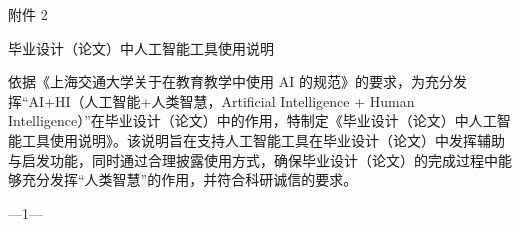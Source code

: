 
\begingroup
{}
\pagestyle{empty}
\flushbottom
{}
\setlength{\parindent}{2em}
\setlength{\parskip}{0pt}

\newcommand{\AIStatementPageNumber}[1]{%
  \vfill
  \begin{center}\fontsize{10.5bp}{12bp}\selectfont —#1—\end{center}%
  \clearpage
}

\thispagestyle{empty}
{\fontsize{14bp}{20bp}\selectfont\noindent 附件 2\par}
\vspace{1.0cm}
{\centering\fontsize{21bp}{30bp}\selectfont 毕业设计（论文）中人工智能工具使用说明\par}
\vspace{0.75cm}
{\fontsize{16bp}{29bp}\selectfont
依据《上海交通大学关于在教育教学中使用 AI 的规范》的要求，为充分发挥“AI+HI（人工智能+人类智慧，Artificial Intelligence + Human Intelligence）”在毕业设计（论文）中的作用，特制定《毕业设计（论文）中人工智能工具使用说明》。该说明旨在支持人工智能工具在毕业设计（论文）中发挥辅助与启发功能，同时通过合理披露使用方式，确保毕业设计（论文）的完成过程中能够充分发挥“人类智慧”的作用，并符合科研诚信的要求。\par
}
\AIStatementPageNumber{1}


